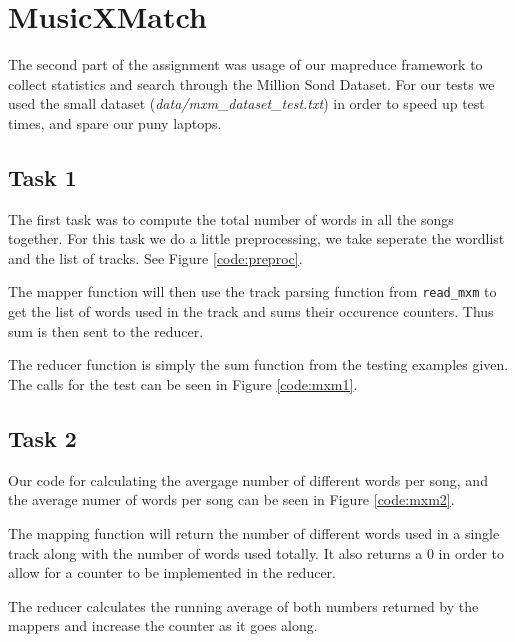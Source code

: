 \section{MusicXMatch}

The second part of the assignment was usage of our mapreduce framework to
collect statistics and search through the Million Sond Dataset.  For our tests
we used the small dataset (\textit{data/mxm\_dataset\_test.txt}) in order to
speed up test times, and spare our puny laptops.

\subsection{Task 1}
The first task was to compute the total number of words in all the songs
together. For this task we do a little preprocessing, we take seperate the
wordlist and the list of tracks. See Figure \ref{code:preproc}.


The mapper function will then use the track parsing function from
\texttt{read\_mxm} to get the list of words used in the track and sums their
occurence counters. Thus sum is then sent to the reducer.

The reducer function is simply the sum function from the testing examples
given. The calls for the test can be seen in Figure \ref{code:mxm1}.


\subsection{Task 2}
Our code for calculating the avergage number of different words per song, and
the average numer of words per song can be seen in Figure \ref{code:mxm2}.


The mapping function will return the number of different words used in a single
track along with the number of words used totally. It also returns a $0$ in
order to allow for a counter to be implemented in the reducer.

The reducer calculates the running average of both numbers returned by the
mappers and increase the counter as it goes along.

